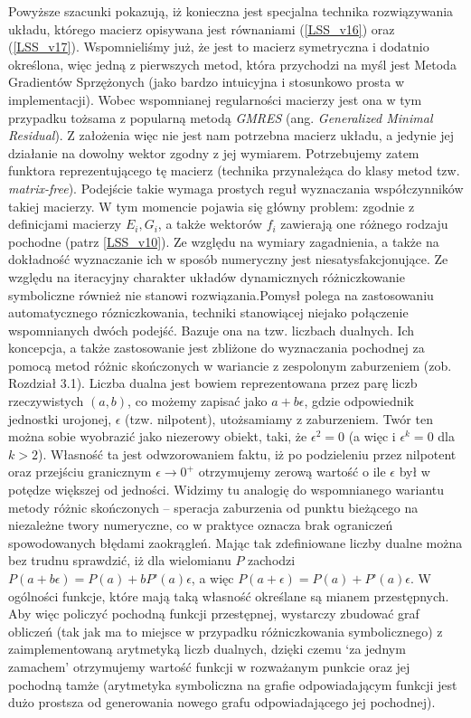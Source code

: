 \documentclass[12pt, twoside]{book}
\begin{document}
Powyższe szacunki pokazują, iż konieczna jest specjalna technika rozwiązywania układu, którego macierz opisywana jest równaniami (\ref{LSS_v16}) oraz (\ref{LSS_v17}). Wspomnieliśmy już, że jest to macierz symetryczna i dodatnio określona, więc jedną z pierwszych metod, która przychodzi na myśl jest Metoda Gradientów Sprzężonych (jako bardzo intuicyjna i stosunkowo prosta w implementacji). Wobec wspomnianej regularności macierzy jest ona w tym przypadku tożsama z popularną metodą \textit{GMRES} (ang. \textit{Generalized Minimal Residual}). Z założenia więc nie jest nam potrzebna macierz układu, a jedynie jej działanie na dowolny wektor zgodny z jej wymiarem. Potrzebujemy zatem funktora reprezentującego tę macierz (technika przynależąca do klasy metod tzw. \textit{matrix-free}).\newline
Podejście takie wymaga prostych reguł wyznaczania współczynników takiej macierzy. W tym momencie pojawia się główny problem: zgodnie z definicjami macierzy $ E_{i}, G_{i} $, a także wektorów $ f_{i} $ zawierają one różnego rodzaju pochodne (patrz \ref{LSS_v10}). Ze względu na wymiary zagadnienia, a także na dokładność wyznaczanie ich w sposób numeryczny jest niesatysfakcjonujące. Ze względu na iteracyjny charakter układów dynamicznych różniczkowanie symboliczne również nie stanowi rozwiązania.\newline Pomysł polega na zastosowaniu automatycznego rózniczkowania, techniki stanowiącej niejako połączenie wspomnianych dwóch podejść. Bazuje ona na tzw. liczbach dualnych. Ich koncepcja, a także zastosowanie jest zbliżone do wyznaczania pochodnej za pomocą metod różnic skończonych w wariancie z zespolonym zaburzeniem (zob. Rozdział 3.1). Liczba dualna jest bowiem reprezentowana przez parę liczb rzeczywistych $ (a,b)$, co możemy zapisać jako $a + b\epsilon$, gdzie odpowiednik jednostki urojonej, $\epsilon$ (tzw. nilpotent), utożsamiamy z zaburzeniem. Twór ten można sobie wyobrazić jako niezerowy obiekt, taki, że $\epsilon^{2} = 0$ (a więc i $\epsilon^{k} = 0 $ dla $k > 2$). Własność ta jest odwzorowaniem faktu, iż po podzieleniu przez nilpotent oraz przejściu granicznym $ \epsilon \rightarrow 0^{+}$ otrzymujemy zerową wartość o ile $ \epsilon $ był w potędze większej od jedności. Widzimy tu analogię do wspomnianego wariantu metody różnic skończonych – speracja zaburzenia od punktu bieżącego na niezależne twory numeryczne, co w praktyce oznacza brak ograniczeń spowodowanych błędami zaokrągleń. \newline
Mając tak zdefiniowane liczby dualne można bez trudnu sprawdzić, iż dla wielomianu $ P $ zachodzi $ P(a + b\epsilon) = P(a) + bP’(a)\epsilon$, a więc  $ P(a + \epsilon) = P(a) + P’(a)\epsilon$.  W ogólności funkcje, które mają taką własność określane są mianem przestępnych. Aby więc policzyć pochodną funkcji przestępnej, wystarczy zbudować graf obliczeń (tak jak ma to miejsce w przypadku różniczkowania symbolicznego) z zaimplementowaną arytmetyką liczb dualnych, dzięki czemu ‘za jednym zamachem’ otrzymujemy wartość funkcji w rozważanym punkcie oraz jej pochodną tamże (arytmetyka symboliczna na grafie odpowiadającym funkcji jest dużo prostsza od generowania nowego grafu odpowiadającego jej pochodnej). \newline
\end{document}
